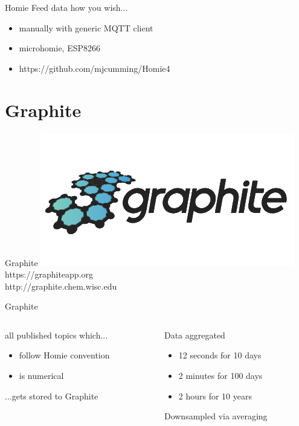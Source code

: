 \documentclass{presentation}
\begin{document}
\begin{frame}{Homie}
  Feed data how you wish...
  \begin{itemize}
    \item{manually with generic MQTT client}
    \item{microhomie, ESP8266}
    \item{https://github.com/mjcumming/Homie4}
  \end{itemize}
\end{frame}

\section{Graphite}

\begin{frame}{Graphite}
  \center
  \includegraphics[width=\textwidth/2]{./Graphite.png} \\
  https://graphiteapp.org \\
  http://graphite.chem.wisc.edu
\end{frame}

\begin{frame}{Graphite}
  \begin{columns}
    \begin{column}{0.5\textwidth}
      all published topics which...
      \begin{itemize}
        \item follow Homie convention
        \item is numerical
      \end{itemize}
      ...gets stored to Graphite
    \end{column}
    \begin{column}{0.5\textwidth}
      Data aggregated
      \begin{itemize}
        \item 12 seconds for 10 days
        \item 2 minutes for 100 days
	\item 2 hours for 10 years
      \end{itemize}
      Downsampled via averaging
    \end{column}
  \end{columns}
\end{frame}
\end{document}

